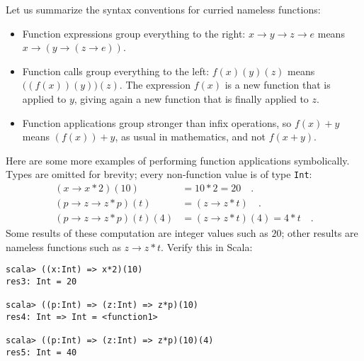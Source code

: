 Let us summarize the syntax conventions for curried nameless functions:
\begin{itemize}
\item Function expressions group everything to the right: $x\rightarrow y\rightarrow z\rightarrow e$
means $x\rightarrow\left(y\rightarrow\left(z\rightarrow e\right)\right)$.
\item Function calls group everything to the left: $f(x)(y)(z)$ means $\big((f(x))(y)\big)(z)$.
The expression $f(x)$ is a new function that is applied to $y$,
giving again a new function that is finally applied to $z$.
\item Function applications group stronger than infix operations, so $f(x)+y$
means $(f(x))+y$, as usual in mathematics, and not $f(x+y)$.
\end{itemize}
Here are some more examples of performing function applications symbolically.
Types are omitted for brevity; every non-function value is of type
\texttt{}\lstinline!Int!:
\begin{align*}
\left(x\rightarrow x*2\right)(10) & =10*2=20\quad.\\
\left(p\rightarrow z\rightarrow z*p\right)\left(t\right) & =(z\rightarrow z*t)\quad.\\
\left(p\rightarrow z\rightarrow z*p\right)(t)(4) & =(z\rightarrow z*t)(4)=4*t\quad.
\end{align*}
Some results of these computation are integer values such as $20$;
other results are nameless functions such as $z\rightarrow z*t$.
Verify this in Scala:
\begin{lstlisting}
scala> ((x:Int) => x*2)(10)
res3: Int = 20

scala> ((p:Int) => (z:Int) => z*p)(10)
res4: Int => Int = <function1>

scala> ((p:Int) => (z:Int) => z*p)(10)(4)
res5: Int = 40 
\end{lstlisting}

